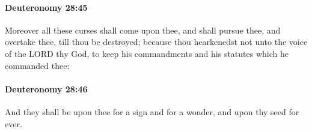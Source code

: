 		\paragraph{Deuteronomy 28:45} %
			\label{DEUTERONOMY-28-45}

			Moreover all these curses shall come upon thee, and shall pursue thee, and overtake thee, till thou be destroyed; because thou hearkenedst not unto the voice of the LORD thy God, to keep his commandments and his statutes which he commanded thee:


		\paragraph{Deuteronomy 28:46} %
			\label{DEUTERONOMY-28-46}

			And they shall be upon thee for a sign and for a wonder, and upon thy seed for ever.


